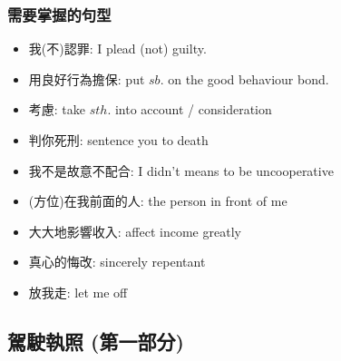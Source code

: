 \subsubsection*{需要掌握的句型}
\begin{multicols}{2}
\begin{itemize}
  \itemsep0em
  \item 我(不)認罪: I plead (not) guilty.
  \item 用良好行為擔保: put $sb.$ on the good behaviour bond.
  \item 考慮: take $sth.$ into account / consideration
  \item 判你死刑: sentence you to death
  \item 我不是故意不配合: I didn't means to be uncooperative
  \item (方位)在我前面的人: the person in front of me
  \item 大大地影響收入: affect income greatly
  \item 真心的悔改: sincerely repentant
  \item 放我走: let me off
\end{itemize}
\end{multicols}

\subsection{駕駛執照 (第一部分)}
